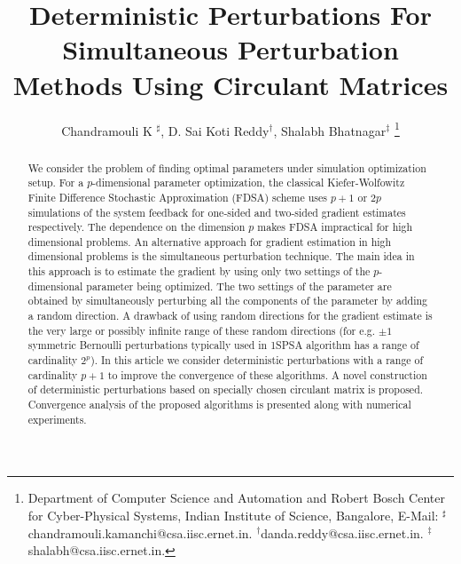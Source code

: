 \documentclass[letterpaper, 10 pt, conference]{ieeeconf}  %
\title{\LARGE \bf
 Deterministic Perturbations For Simultaneous Perturbation Methods Using
 Circulant Matrices
}
\author{Chandramouli K $^\sharp$, D. Sai Koti Reddy$^\dagger$, Shalabh Bhatnagar$^\ddag$
\thanks{
Department of Computer Science and Automation and 
Robert Bosch Center for Cyber-Physical Systems,
Indian Institute of Science, Bangalore, 
E-Mail: $^\sharp$chandramouli.kamanchi@csa.iisc.ernet.in.
$^\dagger$danda.reddy@csa.iisc.ernet.in.
$^\ddag$shalabh@csa.iisc.ernet.in.}
}
\begin{document}
% 
% 
\maketitle
% 
% 
\begin{abstract}
We consider the problem of finding optimal parameters under simulation optimization setup.
For a $p$-dimensional parameter optimization, the classical Kiefer-Wolfowitz Finite Difference Stochastic 
Approximation (FDSA) scheme uses $p+1$ or $2p$ simulations of the system feedback for one-sided 
and two-sided gradient estimates respectively.
The dependence on the dimension $p$ makes FDSA impractical for high dimensional problems.
An alternative approach for gradient estimation in high dimensional problems is the 
simultaneous perturbation technique.
The main idea in this approach is to estimate the gradient by using only two settings of 
the $p$-dimensional parameter being optimized. 
The two settings of the parameter are obtained by
simultaneously perturbing all the components of the parameter by adding a random 
direction. A drawback of using random directions for the gradient estimate is the very large
or possibly infinite range of these random directions (for e.g. $\pm 1$ symmetric 
Bernoulli perturbations typically used in 1SPSA algorithm has a range of cardinality $2^p$).
In this article we consider deterministic perturbations with a range of cardinality
$p+1$ to improve the convergence of these algorithms. A novel construction of deterministic perturbations 
based on specially chosen circulant matrix is proposed. Convergence analysis of the proposed
algorithms is presented along with numerical experiments. 
\end{abstract}
\end{document}
